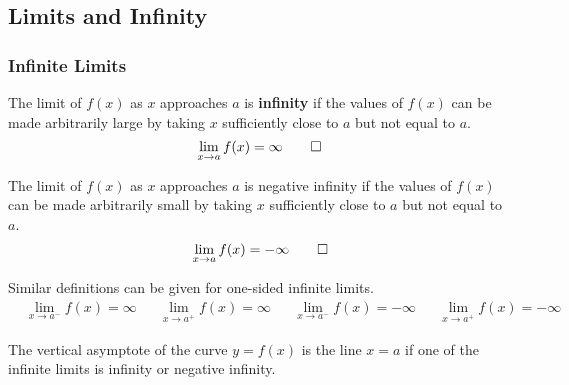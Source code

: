 \subsection{Limits and Infinity}
\subsubsection{Infinite Limits}
\begin{definition}
    The limit of \(f(x)\) as \(x\) approaches \(a\) is \textbf{infinity} if
    the values of \(f(x)\) can be made arbitrarily large by taking \(x\)
    sufficiently close to \(a\) but not equal to \(a\).
    \[\lim_{x\to a}f(x)=\infty\qedhere\]
\end{definition}
\begin{definition}
    The limit of \(f(x)\) as \(x\) approaches \(a\) is negative infinity if
    the values of \(f(x)\) can be made arbitrarily small by taking \(x\)
    sufficiently close to \(a\) but not equal to \(a\).
    \[\lim_{x\to a}f(x)=-\infty\qedhere\]
\end{definition}
Similar definitions can be given for one-sided infinite limits.
\begin{align*}
    &\lim_{x\to a^-}f(x)=\infty && \lim_{x\to a^+}f(x)=\infty&
    &\lim_{x\to a^-}f(x)=-\infty && \lim_{x\to a^+}f(x)=-\infty&
\end{align*}
\begin{definition}
    The vertical asymptote of the curve \(y=f(x)\) is the line \(x=a\) if one
    of the infinite limits is infinity or negative infinity.
\end{definition}

